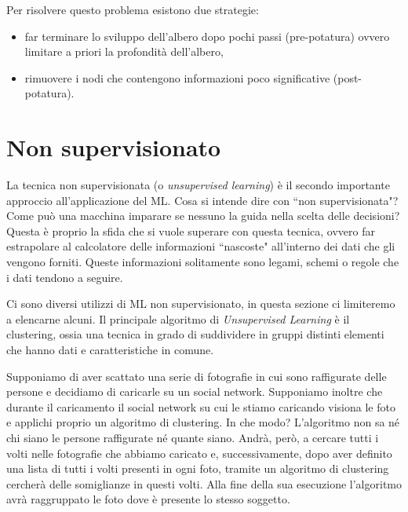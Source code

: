 \documentclass[12pt,italian]{report}
\begin{document}
Per risolvere questo problema esistono due strategie:
\begin{itemize}
	\item far terminare lo sviluppo dell'albero dopo pochi passi (pre-potatura) ovvero limitare a priori la profondità dell'albero,
	
	\item rimuovere i nodi che contengono informazioni poco significative (post-potatura).
\end{itemize}

\section{Non supervisionato}
La tecnica non supervisionata (o \emph{unsupervised learning}) è il secondo importante approccio all'applicazione del ML. Cosa si intende dire con ``non supervisionata"? Come può una macchina imparare se nessuno la guida nella scelta delle decisioni?
Questa è proprio la sfida che si vuole superare con questa tecnica, ovvero far estrapolare al calcolatore delle informazioni ``nascoste" all'interno dei dati che gli vengono forniti. Queste informazioni solitamente sono legami, schemi o regole che i dati tendono a seguire.

Ci sono diversi utilizzi di ML non supervisionato, in questa sezione ci limiteremo a elencarne alcuni. Il principale algoritmo di \emph{Unsupervised Learning} è il clustering, ossia una tecnica in grado di suddividere in gruppi distinti elementi che hanno dati e caratteristiche in comune.

Supponiamo di aver scattato una serie di fotografie in cui sono raffigurate delle persone e decidiamo di caricarle su un social network. Supponiamo inoltre che durante il caricamento il social network su cui le stiamo caricando visiona le foto e applichi proprio un algoritmo di clustering. In che modo? L'algoritmo non sa né chi siano le persone raffigurate né quante siano. Andrà, però, a cercare tutti i volti nelle fotografie che abbiamo caricato e, successivamente, dopo aver definito una lista di tutti i volti presenti in ogni foto, tramite un algoritmo di clustering cercherà delle somiglianze in questi volti. Alla fine della sua esecuzione l'algoritmo avrà raggruppato le foto dove è presente lo stesso soggetto.
\end{document}
